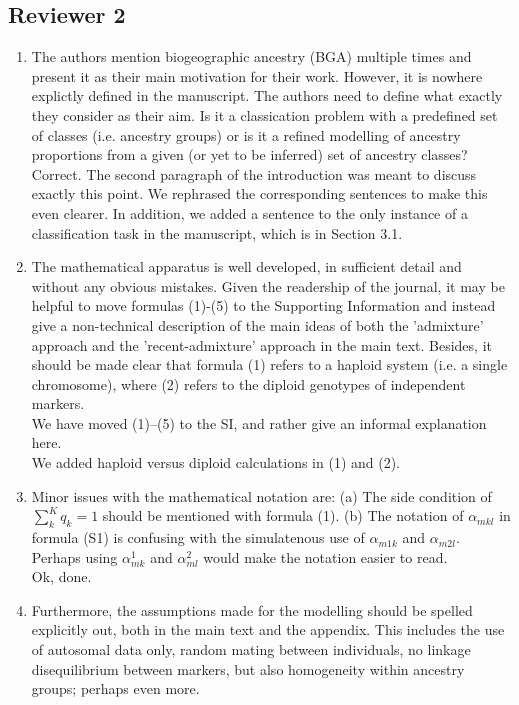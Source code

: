 \documentclass[12pt]{article}
\theoremstyle{definition}
\begin{document}
\subsection*{Reviewer 2}
\begin{enumerate}
\item The authors mention biogeographic ancestry (BGA) multiple times and present it as their main motivation for their work. However, it is nowhere explictly defined in the manuscript. The authors need to define what exactly they consider as their aim. Is it a classication problem with a predefined set of classes (i.e. ancestry groups) or is it a refined modelling of ancestry proportions from a given (or yet to be inferred) set of ancestry classes?
  \\
  {\color{blue} Correct. The second paragraph of the introduction was meant to discuss exactly this point. We rephrased the   corresponding sentences to make this even clearer. In addition, we added a sentence to the only instance of a classification task in the manuscript, which is in Section 3.1.}
\item The mathematical apparatus is well developed, in sufficient detail and without any obvious mistakes. Given the readership of the journal, it may be helpful to move formulas (1)-(5) to the Supporting Information and instead give a non-technical description of the main ideas of both the 'admixture' approach and the 'recent-admixture' approach in the main text. Besides, it should be made clear that formula (1) refers to a haploid system (i.e. a  single chromosome), where (2) refers to the diploid genotypes of independent markers.
  \\
  {\color{blue} We have moved (1)--(5) to the SI, and rather give an informal explanation here.  \\
  We added haploid versus diploid calculations in (1) and (2).}
\item Minor issues with the mathematical notation are: (a) The side condition of $\sum_k^K q_k = 1$ should be mentioned with formula (1). (b) The notation of $\alpha_{mkl}$ in formula (S1) is confusing with the simulatenous use of $\alpha_{m1k}$ and $\alpha_{m2l}$. Perhaps using $\alpha^1_{mk}$ and $\alpha^2_{ml}$ would make the notation easier to read.
  \\
  {\color{blue} Ok, done.}
\item Furthermore, the assumptions made for the modelling should be spelled explicitly out, both in the main text and the appendix. This includes the use of autosomal data only, random mating between individuals, no linkage disequilibrium between markers, but also homogeneity within ancestry groups; perhaps even more.

\end{enumerate}
\end{document}
